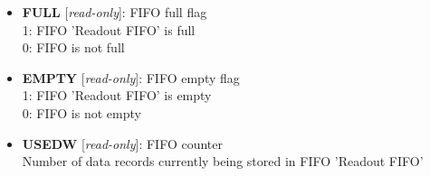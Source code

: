 \vspace{12pt}
\noindent
{}

\begin{itemize}
\item \begin{small}
{\bf 
FULL
} [\emph{read-only}]: FIFO full flag
\\
1: FIFO 'Readout FIFO' is full\\0: FIFO is not full
\end{small}
\item \begin{small}
{\bf 
EMPTY
} [\emph{read-only}]: FIFO empty flag
\\
1: FIFO 'Readout FIFO' is empty\\0: FIFO is not empty
\end{small}
\item \begin{small}
{\bf 
USEDW
} [\emph{read-only}]: FIFO counter
\\
Number of data records currently being stored in FIFO 'Readout FIFO'
\end{small}
\end{itemize}



